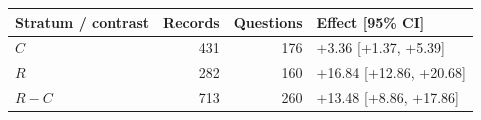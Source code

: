 \begin{tabular}{lrrl}
\toprule
Stratum / contrast & Records & Questions & Effect [95\% CI]\\
\midrule
$C$ & 431 & 176 & +3.36 [+1.37, +5.39]\\
$R$ & 282 & 160 & +16.84 [+12.86, +20.68]\\
$R-C$ & 713 & 260 & +13.48 [+8.86, +17.86]\\
\bottomrule
\end{tabular}
